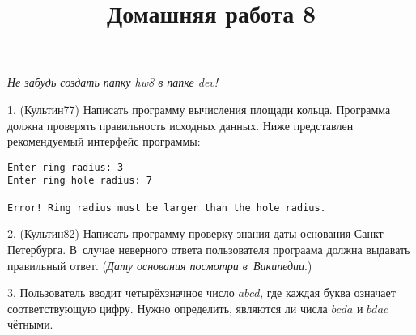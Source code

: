 \documentclass[12pt,russian,draft]{article}
\title{Домашняя работа 8}
\date{}
\begin{document}
\maketitle{}

\emph{Не забудь создать папку hw8 в папке dev!}

1. (Культин77) Написать программу вычисления площади кольца. Программа должна
проверять правильность исходных данных. Ниже представлен рекомендуемый
интерфейс программы:
\begin{Verbatim}
Enter ring radius: 3
Enter ring hole radius: 7

Error! Ring radius must be larger than the hole radius.
\end{Verbatim}

2. (Культин82) Написать программу проверку знания даты основания
Санкт-Петербурга. В~случае неверного ответа пользователя програама должна
выдавать правильный ответ. (\emph{Дату основания посмотри в~Википедии}.)

3. Пользователь вводит четырёхзначное число $abcd$, где каждая буква означает
соответ\-ствующую цифру. Нужно определить, являются ли числа $bcda$ и $bdac$
чётными. 
\end{document}
